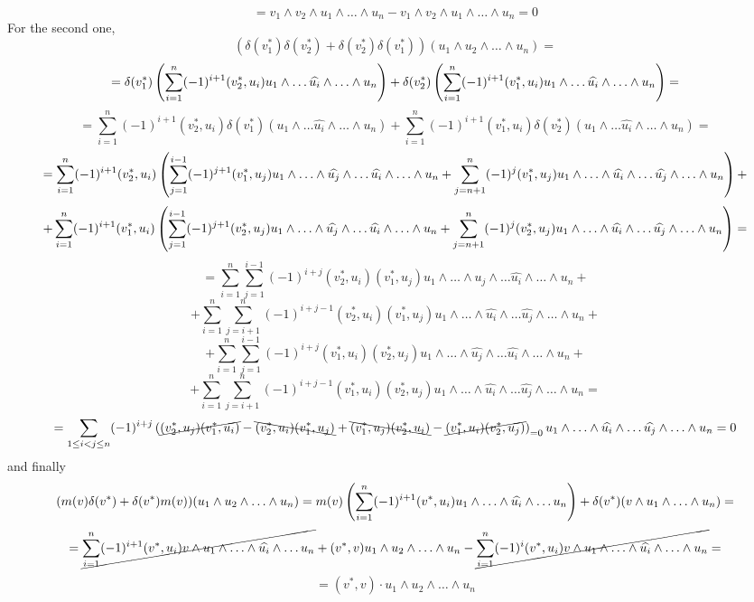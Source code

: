 \documentclass[8pt,fleqn]{article} %
\begin{document}
\begin{enumerate}[label=\bfseries Problem \arabic*.]
\begin{enumerate}[label=(\arabic*).]
				\[=v_1\wedge v_2\wedge u_1\wedge\hdots\wedge u_n-v_1\wedge v_2\wedge u_1\wedge\hdots\wedge u_n=0\]
				For the second one,
\[(\delta(v_1^*)\delta(v_2^*)+\delta(v_2^*)\delta(v_1^*))(u_1\wedge u_2\wedge\hdots\wedge u_n)=\]
\[=\delta(v_1^*)\mybra{\sum_{i=1}^n(-1)^{i+1}(v_2^*,u_i)u_1\wedge\hdots\widehat{u_i}\wedge\hdots\wedge u_n}
+\delta(v_2^*)\mybra{\sum_{i=1}^n(-1)^{i+1}(v_1^*,u_i)u_1\wedge\hdots\widehat{u_i}\wedge\hdots\wedge u_n}=\]
\[=\sum_{i=1}^n(-1)^{i+1}(v_2^*,u_i)\delta(v_1^*)(u_1\wedge\hdots\widehat{u_i}\wedge\hdots\wedge u_n)
+{\sum_{i=1}^n(-1)^{i+1}(v_1^*,u_i)\delta(v_2^*)(u_1\wedge\hdots\widehat{u_i}\wedge\hdots\wedge u_n)}=\]
\[=\sum_{i=1}^n(-1)^{i+1}(v_2^*,u_i)\mybra{
\sum_{j=1}^{i-1}(-1)^{j+1}(v_1^*,u_j)u_1\wedge\hdots\wedge\widehat{u_j}\wedge\hdots\widehat{u_i}\wedge\hdots\wedge u_n+
\sum_{j=n+1}^{n}(-1)^{j}(v_1^*,u_j)u_1\wedge\hdots\wedge\widehat{u_i}\wedge\hdots\widehat{u_j}\wedge\hdots\wedge u_n}+\]\[+
\sum_{i=1}^n(-1)^{i+1}(v_1^*,u_i)\mybra{
\sum_{j=1}^{i-1}(-1)^{j+1}(v_2^*,u_j)u_1\wedge\hdots\wedge\widehat{u_j}\wedge\hdots\widehat{u_i}\wedge\hdots\wedge u_n+
\sum_{j=n+1}^{n}(-1)^{j}(v_2^*,u_j)u_1\wedge\hdots\wedge\widehat{u_i}\wedge\hdots\widehat{u_j}\wedge\hdots\wedge u_n}=
\]
\[=\sum_{i=1}^n\sum_{j=1}^{i-1}(-1)^{i+j}(v_2^*,u_i)(v_1^*,u_j)u_1\wedge\hdots\wedge\widehat{u_j}\wedge\hdots\widehat{u_i}\wedge\hdots\wedge u_n+\]
\[+\sum_{i=1}^n\sum_{j=i+1}^{n}(-1)^{i+j-1}(v_2^*,u_i)(v_1^*,u_j)u_1\wedge\hdots\wedge\widehat{u_i}\wedge\hdots\widehat{u_j}\wedge\hdots\wedge u_n+\]
\[+\sum_{i=1}^n\sum_{j=1}^{i-1}(-1)^{i+j}(v_1^*,u_i)(v_2^*,u_j)u_1\wedge\hdots\wedge\widehat{u_j}\wedge\hdots\widehat{u_i}\wedge\hdots\wedge u_n+\]
\[+\sum_{i=1}^n\sum_{j=i+1}^{n}(-1)^{i+j-1}(v_1^*,u_i)(v_2^*,u_j)u_1\wedge\hdots\wedge\widehat{u_i}\wedge\hdots\widehat{u_j}\wedge\hdots\wedge u_n=\]
\[=\sum_{1\leq i<j\leq n}(-1)^{i+j}
\mybra{\cancel{(v_2^*,u_j)(v_1^*,u_i)}-\bcancel{(v_2^*,u_i)(v_1^*,u_j)}+\bcancel{(v_1^*,u_j)(v_2^*,u_i)}-\cancel{(v_1^*,u_i)(v_2^*,u_j)}
}_{=0}u_1\wedge\hdots\wedge\widehat{u_i}\wedge\hdots\widehat{u_j}\wedge\hdots\wedge u_n=0\]
and finally
\[(m(v)\delta(v^*)+\delta(v^*)m(v))(u_1\wedge u_2\wedge\hdots\wedge u_n)=m(v)\mybra{\sum_{i=1}^n(-1)^{i+1}(v^*,u_i)u_1\wedge\hdots\wedge\widehat{u_i}
\wedge\hdots u_n}+\delta(v^*)(v\wedge u_1\wedge\hdots\wedge u_n)=\]
\[=\cancel{\sum_{i=1}^n(-1)^{i+1}(v^*,u_i)v\wedge u_1\wedge\hdots\wedge\widehat{u_i}\wedge\hdots u_n}+(v^*,v)u_1\wedge u_2\wedge\hdots\wedge u_n-
\cancel{\sum_{i=1}^n(-1)^i(v^*,u_i)v\wedge u_1\wedge\hdots\wedge\widehat{u_i}\wedge\hdots\wedge u_n}=\]
\[=(v^*,v)\cdot u_1\wedge u_2\wedge\hdots\wedge u_n\]

\end{enumerate}
\end{enumerate}
\end{document}
